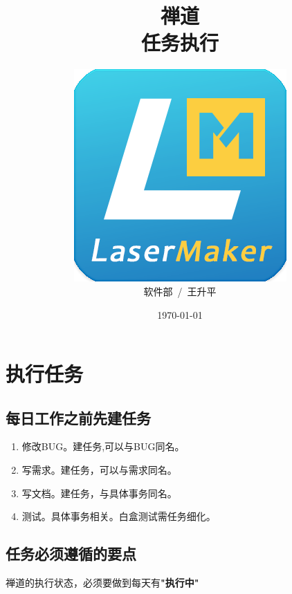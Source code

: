\documentclass[AutoFakeBold,AutoFakeSlant]{beamer}
\title{\textbf{禅道}\\任务执行}
\date{\today}
\author{\includegraphics[width=0.26\linewidth]{LaserMaker}\\软件部~/~王升平}
\begin{document}
	\maketitle
	
	\section{执行任务}
	\subsection{每日工作之前先建任务}
	
	\begin{frame}[fragile]
		\begin{enumerate}
			\item 修改BUG。建任务,可以与BUG同名。
			\item 写需求。建任务，可以与需求同名。
			\item 写文档。建任务，与具体事务同名。
			\item 测试。具体事务相关。白盒测试需任务细化。
		\end{enumerate}
	\end{frame}
	
	\subsection{任务必须遵循的要点}
	\begin{frame}[fragile]
		\begin{center}
			禅道的执行状态，必须要做到每天有{\large \textbf{"执行中"}}
		\end{center} 
	\end{frame}
	
\end{document}
